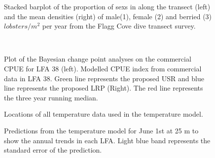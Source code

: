 \documentclass[11pt]{article}
\newcommand{\e}{/SpinDr/backup/bio_data/bio.lobster/figures/LFA3438Framework2019/} %
\begin{document}
\begin{landscape}
\begin{figure}
    \centering

       \caption{Stacked barplot of the proportion of sexs in along the transect (left) and the mean densities (right) of male(1), female (2) and berried (3) $lobsters/m^2$ per year from the Flagg Cove dive transect survey.}

    \end{figure}


\begin{figure}
        \centering
                \\

\caption{Plot of the Bayesian change point analyses on the commercial CPUE for LFA 38 (left). Modelled CPUE index from commercial data in LFA 38. Green line represents the proposed USR and blue line represents the proposed LRP (Right). The red line represents the three year running median.  }
        \end{figure}
\end{landscape}




    \begin{figure}
    \centering
        \caption{Locations of all temperature data used in the temperature model.}

    \end{figure}


    \begin{figure}
    \centering
        \caption{Predictions from the temperature model for June 1st at 25 m to show the annual trends in each LFA. Light blue band represents the standard error of the prediction.}

    \end{figure}
  
\end{document}
